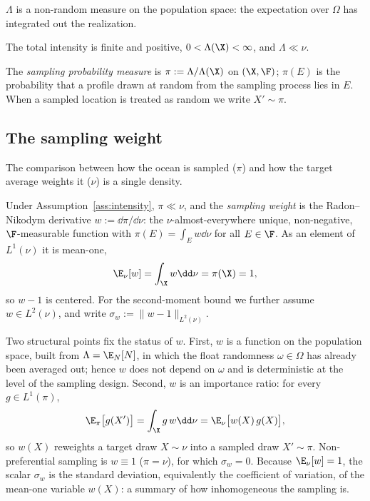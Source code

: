 $\Lambda$ is a non-random measure on the population space: the
expectation over $\Omega$ has integrated out the realization.

\begin{assumption}
\label{ass:intensity}
The total intensity is finite and positive, $0<\Lambda(\X)<\infty$,
and $\Lambda \ll \nu$.
\end{assumption}

\begin{definition}
\label{def:pi}
The \emph{sampling probability measure} is $\pi := \Lambda/\Lambda(\X)$
on $(\X,\F)$; $\pi(E)$ is the probability that a profile drawn at random
from the sampling process lies in $E$. When a sampled location is
treated as random we write $X' \sim \pi$.
\end{definition}

\subsection{The sampling weight}
\label{sec:weight}

The comparison between how the ocean is sampled ($\pi$) and how the
target average weights it ($\nu$) is a single density.

\begin{definition}
\label{def:w}
Under Assumption~\ref{ass:intensity}, $\pi \ll \nu$, and the
\emph{sampling weight} is the Radon--Nikodym derivative
$w := \dd\pi/\dd\nu$: the $\nu$-almost-everywhere unique, non-negative,
$\F$-measurable function with $\pi(E)=\int_E w\dd\nu$ for all $E\in\F$.
As an element of $L^1(\nu)$ it is mean-one,
\begin{equation}
  \E_\nu[w] = \int_\X w \dd\nu = \pi(\X) = 1,
  \label{eq:mean-one}
\end{equation}
so $w-1$ is centered. For the second-moment bound we further assume
$w\in L^2(\nu)$, and write $\sigma_w := \|w-1\|_{L^2(\nu)}$.
\end{definition}

Two structural points fix the status of $w$. First, $w$ is a function
on the population space, built from $\Lambda=\E_N[N]$, in which the
float randomness $\omega\in\Omega$ has already been averaged out; hence
$w$ does not depend on $\omega$ and is deterministic at the level of the
sampling design. Second, $w$ is an importance ratio: for every
$g\in L^1(\pi)$,
\begin{equation}
  \E_\pi\big[g(X')\big] = \int_\X g\,w\dd\nu = \E_\nu\big[w(X)\,g(X)\big],
  \label{eq:importance}
\end{equation}
so $w(X)$ reweights a target draw $X\sim\nu$ into a sampled draw
$X'\sim\pi$. Non-preferential sampling is $w\equiv 1$ ($\pi=\nu$), for
which $\sigma_w=0$. Because $\E_\nu[w]=1$, the scalar $\sigma_w$ is the
standard deviation, equivalently the coefficient of variation, of the
mean-one variable $w(X)$: a summary of how inhomogeneous the sampling
is.


